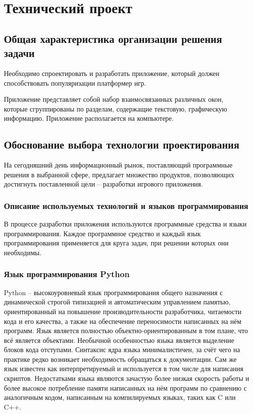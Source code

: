 \section{Технический проект}
\subsection{Общая характеристика организации решения задачи}

Необходимо спроектировать и разработать приложение, который должен способствовать популяризации платформер игр.

Приложение представляет собой набор взаимосвязанных различных окон, которые сгруппированы по разделам, содержащие текстовую, графическую информацию. Приложение располагается на компьютере.

\subsection{Обоснование выбора технологии проектирования}

На сегодняшний день информационный рынок, поставляющий программные решения в выбранной сфере, предлагает множество продуктов, позволяющих достигнуть поставленной цели – разработки игрового приложения.

\subsubsection{Описание используемых технологий и языков программирования}

В процессе разработки приложения используются программные средства и языки программирования. Каждое программное средство и каждый язык программирования применяется для круга задач, при решении которых они необходимы.

\subsubsection{Язык программирования Python}

Python –  высокоуровневый язык программирования общего назначения с динамической строгой типизацией и автоматическим управлением памятью, ориентированный на повышение производительности разработчика, читаемости кода и его качества, а также на обеспечение переносимости написанных на нём программ. Язык является полностью объектно-ориентированным в том плане, что всё является объектами. Необычной особенностью языка является выделение блоков кода отступами. Синтаксис ядра языка минималистичен, за счёт чего на практике редко возникает необходимость обращаться к документации. Сам же язык известен как интерпретируемый и используется в том числе для написания скриптов. Недостатками языка являются зачастую более низкая скорость работы и более высокое потребление памяти написанных на нём программ по сравнению с аналогичным кодом, написанным на компилируемых языках, таких как C или C++.

